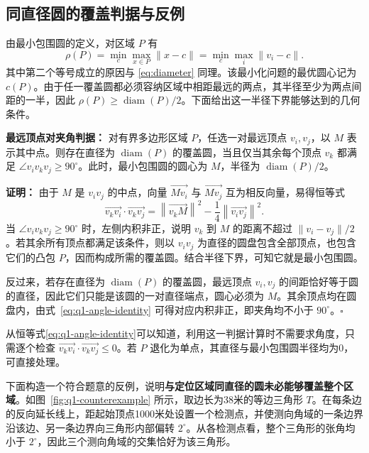 \documentclass[UTF8,a4paper,zihao=-4,fontset=none]{ctexart}
\begin{document}
\subsection{同直径圆的覆盖判据与反例}

由最小包围圆的定义，对区域 \(P\) 有
\begin{equation}
  \rho(P)=\min_c\max_{x\in P}\lVert x-c\rVert
  =\min_c\max_i\lVert v_i-c\rVert .
  \label{eq:mincircle}
\end{equation}
其中第二个等号成立的原因与 \eqref{eq:diameter} 同理。该最小化问题的最优圆心记为 \(c(P)\)。由于任一覆盖圆都必须容纳区域中相距最远的两点，其半径至少为两点间距的一半，因此 \(\rho(P)\ge\operatorname{diam}(P)/2\)。下面给出这一半径下界能够达到的几何条件。

\vspace{0.5em}
\textbf{最远顶点对夹角判据：} 对有界多边形区域 \(P\)，任选一对最远顶点 \(v_i,v_j\)，以 \(M\) 表示其中点。则存在直径为 \(\operatorname{diam}(P)\) 的覆盖圆，当且仅当其余每个顶点 \(v_k\) 都满足 \(\angle v_i v_k v_j\ge90^\circ\)。此时，最小包围圆的圆心为 \(M\)，半径为 \(\operatorname{diam}(P)/2\)。

\textbf{证明：} 由于 \(M\) 是 \(v_iv_j\) 的中点，向量 \(\overrightarrow{Mv_i}\) 与 \(\overrightarrow{Mv_j}\) 互为相反向量，易得恒等式
\begin{equation}
  \overrightarrow{v_kv_i}\cdot\overrightarrow{v_kv_j}
  =\left\lVert\overrightarrow{v_kM}\right\rVert^2
  -\frac14\left\lVert\overrightarrow{v_iv_j}\right\rVert^2.
  \label{eq:q1-angle-identity}
\end{equation}
当 \(\angle v_i v_k v_j\ge90^\circ\) 时，左侧内积非正，说明 \(v_k\) 到 \(M\) 的距离不超过 \(\lVert v_i-v_j\rVert/2\)。若其余所有顶点都满足该条件，则以 \(v_iv_j\) 为直径的圆盘包含全部顶点，也包含它们的凸包 \(P\)，因而构成所需的覆盖圆。结合半径下界，可知它就是最小包围圆。

反过来，若存在直径为 \(\operatorname{diam}(P)\) 的覆盖圆，最远顶点 \(v_i,v_j\) 的间距恰好等于圆的直径，因此它们只能是该圆的一对直径端点，圆心必须为 \(M\)。其余顶点均在圆盘内，由式~\eqref{eq:q1-angle-identity} 可得对应内积非正，即夹角均不小于 \(90^\circ\)。\(\square\)
\vspace{0.5em}

从恒等式\eqref{eq:q1-angle-identity}可以知道，利用这一判据计算时不需要求角度，只需逐个检查 \(\overrightarrow{v_kv_i}\cdot\overrightarrow{v_kv_j}\le0\)。若 \(P\) 退化为单点，其直径与最小包围圆半径均为0，可直接处理。

下面构造一个符合题意的反例，说明\textbf{与定位区域同直径的圆未必能够覆盖整个区域}。如图~\ref{fig:q1-counterexample} 所示，取边长为38米的等边三角形 \(T\)。在每条边的反向延长线上，距起始顶点1000米处设置一个检测点，并使测向角域的一条边界沿该边、另一条边界向三角形内部偏转 \(2^\circ\)。从各检测点看，整个三角形的张角均小于 \(2^\circ\)，因此三个测向角域的交集恰好为该三角形。
\end{document}
